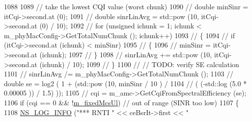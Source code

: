 \begin{DoxyCode}
1088 
1089                                         \textcolor{comment}{// take the lowest CQI value (worst chunk)}
1090                                         \textcolor{comment}{//                              double minSinr = itCqi->second.at
       (0);}
1091                                         \textcolor{comment}{//                              double sinrLinAvg = std::pow (10,
       itCqi->second.at (0) / 10);}
1092                                         \textcolor{comment}{//                              for (unsigned ichunk = 1; ichunk <
       m\_phyMacConfig->GetTotalNumChunk (); ichunk++)}
1093                                         \textcolor{comment}{//                              \{}
1094                                         \textcolor{comment}{//                                      if (itCqi->second.at
       (ichunk) < minSinr)}
1095                                         \textcolor{comment}{//                                      \{}
1096                                         \textcolor{comment}{//                                              minSinr =
       itCqi->second.at (ichunk);}
1097                                         \textcolor{comment}{//                                      \}}
1098                                         \textcolor{comment}{//                                      sinrLinAvg += std::pow (10,
       itCqi->second.at (ichunk) / 10);}
1099                                         \textcolor{comment}{//                              \}}
1100                                         \textcolor{comment}{//                              // TODO: verify SE calculation}
1101                                         \textcolor{comment}{//                              sinrLinAvg /=
       m\_phyMacConfig->GetTotalNumChunk ();}
1103 \textcolor{comment}{}                                        \textcolor{comment}{//                              double se = log2 ( 1 + (std::pow
       (10, minSinr / 10 )  /}
1104                                         \textcolor{comment}{//                                              ( (-std::log (5.0 *
       0.00005 )) / 1.5) ));}
1105                                         \textcolor{comment}{//                              cqi =
       m\_amc->GetCqiFromSpectralEfficiency (se);}
1106                                         \textcolor{keywordflow}{if} (cqi == 0 && !\hyperlink{classns3_1_1MmWaveFlexTtiMacScheduler_adcb65237e784d0154cc892e9eafdc883}{m\_fixedMcsUl}) \textcolor{comment}{// out of range (SINR
       too low)}
1107                                         \{
1108                                                 \hyperlink{group__logging_gafbd73ee2cf9f26b319f49086d8e860fb}{NS\_LOG\_INFO} (\textcolor{stringliteral}{"*** RNTI "} << ceBsrIt->first << \textcolor{stringliteral}{"
}
\end{DoxyCode}
